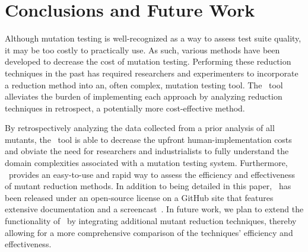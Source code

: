 
\section{Conclusions and Future Work}



Although mutation testing is well-recognized as a way to assess test suite quality, it may be too costly to practically
use. As such, various methods have been developed to decrease the cost of mutation testing. Performing these reduction
techniques in the past has required researchers and experimenters to incorporate a reduction method into an, often
complex, mutation testing tool. The \mr~tool alleviates the burden of implementing each approach by analyzing reduction
techniques in retrospect, a potentially more cost-effective method.


By retrospectively analyzing the data collected from a prior analysis of all mutants, the \mr~tool is able to decrease
the upfront human-implementation costs and obviate the need for researchers and industrialists to fully understand the domain
complexities associated with a mutation testing system. Furthermore, \mr~provides an easy-to-use and rapid way to assess
the efficiency and effectiveness of mutant reduction methods. In addition to being detailed in this paper, \mr~has been
released under an open-source license on a GitHub site that features extensive documentation and a
screencast~\cite{tool}. In future work, we plan to extend the functionality of \mr~by integrating additional mutant
reduction techniques, thereby allowing for a more comprehensive comparison of the techniques' efficiency and
effectiveness.

